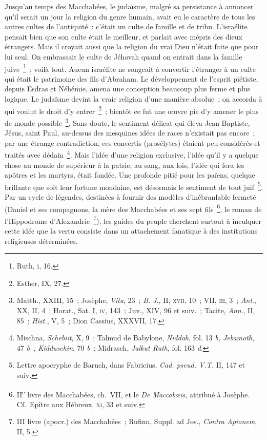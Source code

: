 \documentclass[french,twoside]{book} %
\begin{document}
Jusqu’au temps des Macchabées, le judaïsme, malgré sa persistance à annoncer qu’il serait un jour la religion du genre humain, avait eu le caractère de tous les autres cultes de l’antiquité : c’était un culte de famille et de tribu. L’israélite pensait bien que son culte était le meilleur, et parlait avec mépris des dieux étrangers. Mais il croyait aussi que la religion du vrai Dieu n’était faite que pour lui seul. On embrassait le culte de Jéhovah quand on entrait dans la famille juive \footnote{Ruth, i, 16.} ; voilà tout. Aucun israélite ne songeait à convertir l’étranger à un culte qui était le patrimoine des fils d’Abraham. Le développement de l’esprit piétiste, depuis Esdras et Néhémie, amena une conception beaucoup plus ferme et plus logique. Le judaïsme devint la vraie religion d’une manière absolue ; on accorda à qui voulut le droit d’y entrer \footnote{Esther, IX, 27.} ; bientôt ce fut une œuvre pie d’y amener le plus de monde possible \footnote{ Matth., XXIII, 15 ; Josèphe, {\itshape Vita}, 23 ; {\itshape B. J}., II, \textsc{xvii}, 10 ; VII, \textsc{iii}, 3 ; {\itshape Ant}., XX, II, 4 ; Horat., Sat. I, \textsc{iv}, 143 ; Juv., XIV, 96 et suiv. ; Tacite, {\itshape Ann}., II, 85 ; {\itshape Hist.}, V, 5 ; Dion Cassius, XXXVII, 17.}. Sans doute, le sentiment délicat qui éleva Jean-Baptiste, Jésus, saint Paul, au-dessus des mesquines idées de races n’existait pas encore ; par une étrange contradiction, ces convertis (prosélytes) étaient peu considérés et traités avec dédain \footnote{ Mischna, {\itshape Schebiit}, X, 9 ; Talmud de Babylone, {\itshape Niddah}, fol. 13 {\itshape b, Jebamoth}, 47 {\itshape b ; Kidduschin}, 70 {\itshape b} ; Midrasch, {\itshape Jalkut Ruth}, fol. 163 {\itshape d}.}. Mais l’idée d’une religion exclusive, l’idée qu’il y a quelque chose au monde de supérieur à la patrie, au sang, aux lois, l’idée qui fera les apôtres et les martyrs, était fondée. Une profonde pitié pour les païens, quelque brillante que soit leur fortune mondaine, est désormais le sentiment de tout juif \footnote{ Lettre apocryphe de Baruch, dans Fabricius, {\itshape Cad. pseud. V.T.} II, 147 et suiv.}. Par un cycle de légendes, destinées à fournir des modèles d’inébranlable fermeté (Daniel et ses compagnons, la mère des Macchabées et ses sept fils \footnote{ II\textsuperscript{e} livre des Macchabées, ch. VII, et le {\itshape De Maccabœis}, attribué à Josèphe. Cf. Epître aux Hébreux, \textsc{xi}, 33 et suiv.}, le roman de l’Hippodrome d’Alexandrie \footnote{ III livre (apocr.) des Macchabées ; Rufinn, Suppl. ad Jos., {\itshape Contra Apionem}, II, 5.}), les guides du peuple cherchent surtout à inculquer cette idée que la vertu consiste dans un attachement fanatique à des institutions religieuses déterminées.\par
\end{document}
